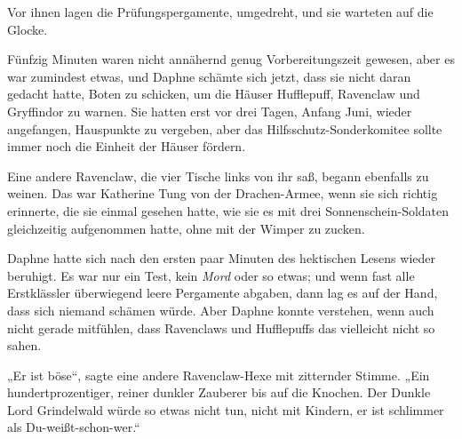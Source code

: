 Vor ihnen lagen die Prüfungspergamente, umgedreht, und sie warteten auf die Glocke.

Fünfzig Minuten waren nicht annähernd genug Vorbereitungszeit gewesen, aber es war zumindest etwas, und Daphne schämte sich jetzt, dass sie nicht daran gedacht hatte, Boten zu schicken, um die Häuser Hufflepuff, Ravenclaw und Gryffindor zu warnen. Sie hatten erst vor drei Tagen, Anfang Juni, wieder angefangen, Hauspunkte zu vergeben, aber das Hilfsschutz-Sonderkomitee sollte immer noch die Einheit der Häuser fördern.

Eine andere Ravenclaw, die vier Tische links von ihr saß, begann ebenfalls zu weinen. Das war Katherine Tung von der Drachen-Armee, wenn sie sich richtig erinnerte, die sie einmal gesehen hatte, wie sie es mit drei Sonnenschein-Soldaten gleichzeitig aufgenommen hatte, ohne mit der Wimper zu zucken.

Daphne hatte sich nach den ersten paar Minuten des hektischen Lesens wieder beruhigt. Es war nur ein Test, kein \emph{Mord} oder so etwas; und wenn fast alle Erstklässler überwiegend leere Pergamente abgaben, dann lag es auf der Hand, dass sich niemand schämen würde. Aber Daphne konnte verstehen, wenn auch nicht gerade mitfühlen, dass Ravenclaws und Hufflepuffs das vielleicht nicht so sahen.

„Er ist böse“, sagte eine andere Ravenclaw-Hexe mit zitternder Stimme.
„Ein hundertprozentiger, reiner dunkler Zauberer bis auf die Knochen. Der Dunkle Lord Grindelwald würde so etwas nicht tun, nicht mit Kindern, er ist schlimmer als Du-weißt-schon-wer.“

